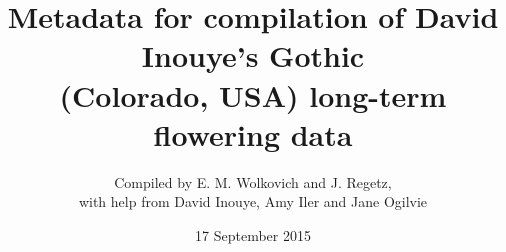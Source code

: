 \documentclass[11pt,a4paper]{article}
\begin{document}




\title {Metadata for compilation of David Inouye's Gothic \protect\\ (Colorado, USA) long-term flowering data}
\author{Compiled by E. M. Wolkovich and J. Regetz, \protect\\ with help
  from David Inouye, Amy Iler and Jane Ogilvie}
\date{17 September 2015}
\maketitle
\tableofcontents
\end{document}
